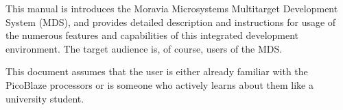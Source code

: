 This manual is introduces the Moravia Microsystems Multitarget Development System (MDS), and provides detailed
description and instructions for usage of the numerous features and capabilities of this integrated development
environment. The target audience is, of course, users of the MDS.

This document assumes that the user is either already familiar with the PicoBlaze processors or is someone who actively
learns about them like a university student.
